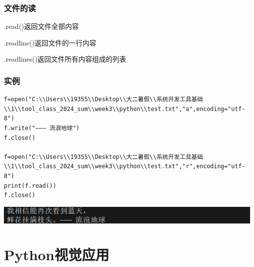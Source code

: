 \documentclass[UTF8,a4paper]{ctexart}
\begin{document}
\subsubsection{文件的读}
.read()返回文件全部内容\par
.readline()返回文件的一行内容\par
.readlines()返回文件所有内容组成的列表\par
\subsubsection{实例}
\begin{lstlisting}
f=open("C:\\Users\\19355\\Desktop\\大二暑假\\系统开发工具基础\\1\\tool_class_2024_sum\\week3\\python\\test.txt","a",encoding="utf-8")
f.write("——— 流浪地球")
f.close()

f=open("C:\\Users\\19355\\Desktop\\大二暑假\\系统开发工具基础\\1\\tool_class_2024_sum\\week3\\python\\test.txt","r",encoding="utf-8")
print(f.read())
f.close()

\end{lstlisting}
\includegraphics[width=1\textwidth]{./python/file1.png}

\section{Python视觉应用}
\end{document}
